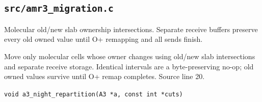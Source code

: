 \subsection{\texttt{src/amr3\_migration.c}}
Molecular old/new slab ownership intersections. Separate receive buffers preserve every old owned value until O+ remapping and all sends finish.
\begin{description}[style=nextline,leftmargin=0pt,labelindent=0pt,labelwidth=0pt,labelsep=0pt]
\item[\texttt{a3\_night\_repartition}] Move only molecular cells whose owner changes using old/new slab intersections and separate receive storage. Identical intervals are a byte-preserving no-op; old owned values survive until O+ remap completes. Source line 20.\par
{\small\nolinkurl{void a3_night_repartition(A3 *a, const int *cuts)}}
\end{description}
